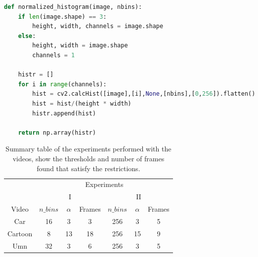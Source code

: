 \documentclass[journal]{IEEEtran}
\begin{document}
\begin{lstlisting}[language=Python, caption=Function used to obtain the normalized histogram of an image, label=list:histogram_difference:get_histogram]
def normalized_histogram(image, nbins):
	if len(image.shape) == 3:
		height, width, channels = image.shape
	else:
		height, width = image.shape
		channels = 1
	
	histr = []
	for i in range(channels):
		hist = cv2.calcHist([image],[i],None,[nbins],[0,256]).flatten()
		hist = hist/(height * width)
		histr.append(hist)
		
	return np.array(histr)
\end{lstlisting}

\begin{table}[b]
	\centering
	\begin{tabular}{ | c | c | c | c | c | c | c |}
		\hline
		& \multicolumn{6}{|c|}{Experiments} \\ 
		\cline{2-7}
		& \multicolumn{3}{|c|}{I} &  \multicolumn{3}{|c|}{II} \\
		\hline
		Video  & $n\_bins$ & $\alpha$ & Frames & $n\_bins$ & $\alpha$ & Frames   \\
		\hline
		Car & 16 & 3 & 3 & 256 & 3 &  5 \\
		Cartoon & 8 & 13 & 18 & 256 & 15 & 9 \\
		Umn & 32 & 3 & 6 & 256 & 3 &  5 \\
		\hline
	\end{tabular}
	\caption{Summary table of the experiments performed with the videos, show the thresholds and number of frames found that satisfy the restrictions.}
	\label{tab:table:histogram_difference}
\end{table}
\end{document}
